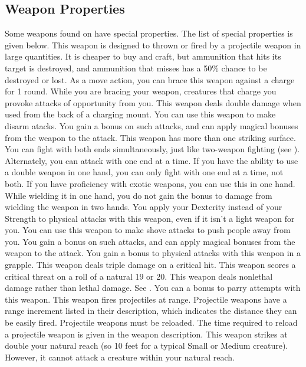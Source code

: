 \subsection{Weapon Properties}
Some weapons found on  have special properties. The list of special properties is given below.
 This weapon is designed to thrown or fired by a projectile weapon in large quantities. It is cheaper to buy and craft, but ammunition that hits its target is destroyed, and ammunition that misses has a 50\% chance to be destroyed or lost.
 As a move action, you can brace this weapon against a charge for 1 round. While you are bracing your weapon, creatures that charge you provoke attacks of opportunity from you.
 This weapon deals double damage when used from the back of a charging mount.
 You can use this weapon to make disarm atacks. You gain a  bonus on such attacks, and can apply magical bonuses from the weapon to the attack.
 This weapon has more than one striking surface. You can fight with both ends simultaneously, just like two-weapon fighting (see ). Alternately, you can attack with one end at a time. If you have the ability to use a double weapon in one hand, you can only fight with one end at a time, not both.
 If you have proficiency with exotic weapons, you can use this in one hand. While wielding it in one hand, you do not gain the  bonus to damage from wielding the weapon in two hands.
 You apply your Dexterity instead of your Strength to physical attacks with this weapon, even if it isn't a light weapon for you.
 You can use this weapon to make shove attacks to push people away from you. You gain a  bonus on such attacks, and can apply magical bonuses from the weapon to the attack.
 You gain a  bonus to physical attacks with this weapon in a grapple.
 This weapon deals triple damage on a critical hit.
 This weapon scores a critical threat on a roll of a natural 19 or 20.
 This weapon deals nonlethal damage rather than lethal damage. See .
 You can a  bonus to parry attempts with this weapon.
 This weapon fires projectiles at range. Projectile weapons have a range increment listed in their description, which indicates the distance they can be easily fired. Projectile weapons must be reloaded. The time required to reload a projectile weapon is given in the weapon description.
 This weapon strikes at double your natural reach (so 10 feet for a typical Small or Medium creature). However, it cannot attack a creature within your natural reach.

